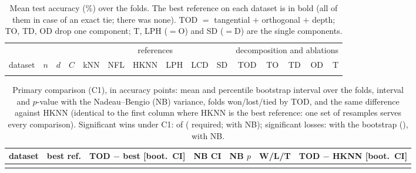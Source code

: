 \documentclass[10pt,a4paper]{article}
\theoremstyle{plain}
\theoremstyle{definition}
\theoremstyle{remark}
\begin{document}
\begin{table}[tb]
\centering\small\setlength{\tabcolsep}{3.6pt}
\begin{tabular}{lrrrrrrrrrrrrrr}
\toprule
& & & & \multicolumn{6}{c}{references} & \multicolumn{5}{c}{decomposition and ablations}\\
\cmidrule(lr){5-10}\cmidrule(lr){11-15}
dataset & $n$ & $d$ & $C$ & kNN & NFL & HKNN & LPH & LCD & SD & TOD & TO & TD & OD & T\\
\midrule
\\
\bottomrule
\end{tabular}
\caption{Mean test accuracy (\%) over the \MetaFolds{} folds. The best reference on each dataset is in bold (all of them in case of an exact tie; there was none). TOD $=$ tangential $+$ orthogonal $+$ depth; TO, TD, OD drop one component; T, LPH ($=$O) and SD ($=$D) are the single components.}
\label{tab:main}
\end{table}

\begin{table}[tb]
\centering\footnotesize\setlength{\tabcolsep}{3.5pt}
\begin{tabular}{lllcccl}
\toprule
dataset & best ref. & TOD $-$ best [boot.\ CI] & NB CI & NB $p$ & W/L/T & TOD $-$ HKNN [boot.\ CI]\\
\midrule
\\
\bottomrule
\end{tabular}
\caption{Primary comparison (C1), in accuracy points: mean and percentile bootstrap interval over the \MetaFolds{} folds, interval and $p$-value with the Nadeau--Bengio (NB) variance, folds won/lost/tied by TOD, and the same difference against HKNN (identical to the first column where HKNN is the best reference: one set of resamples serves every comparison). Significant wins under C1: \NSigWins{} of \NDatasets{} (\NRequired{} required; \NSigWinsNb{} with NB); significant losses: \NSigLosses{} with the bootstrap (\SigLossesList), \NSigLossesNb{} with NB.}
\label{tab:delta}
\end{table}
\end{document}
